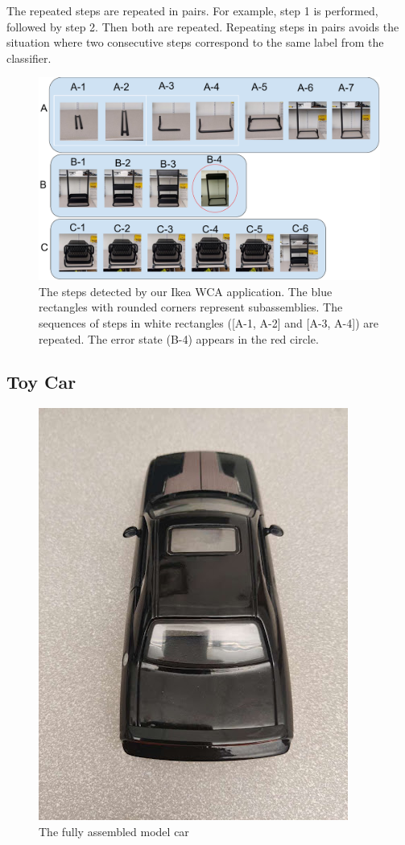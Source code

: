 The repeated steps are repeated in pairs. For example, step 1 is performed,
followed by step 2.
Then both are repeated.
Repeating steps in pairs avoids the situation where two consecutive steps
correspond to the same label from the classifier.

\begin{figure}
  \includegraphics[width=\columnwidth]{figures/ikea_subassemblies.pdf}
  \caption[The steps detected by our Ikea WCA application]{
    The steps detected by our Ikea WCA application.
    The blue rectangles with rounded corners represent subassemblies.
    The sequences of steps in white rectangles ([A-1, A-2] and [A-3, A-4])
    are repeated.
    The error state (B-4) appears in the red circle.
  }\label{fig:ikea_cart}
\end{figure}

\subsection{Toy Car}\label{sec:toy_car}

\begin{figure}
  \includegraphics{figures/full_toycar.jpg}
  \caption{
    The fully assembled model car
  }\label{fig:full_toycar}
\end{figure}

